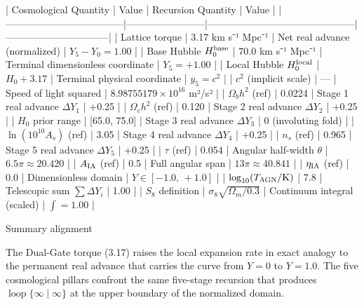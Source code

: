 | Cosmological Quantity              | Value                  | Recursion Quantity                          | Value                          |
|------------------------------------|------------------------|---------------------------------------------|--------------------------------|
| Lattice torque                     | 3.17 km s⁻¹ Mpc⁻¹     | Net real advance (normalized)               | \(Y_5 - Y_0 = 1.00\)          |
| Base Hubble \(H_0^{\rm base}\)     | 70.0 km s⁻¹ Mpc⁻¹     | Terminal dimensionless coordinate           | \(Y_5 = +1.00\)               |
| Local Hubble \(H_0^{\rm local}\)   | \(H_0 + 3.17\)        | Terminal physical coordinate                | \(y_5 = c^2\)                 |
| \(c^2\) (implicit scale)           | —                      | Speed of light squared                      | \(8.98755179 \times 10^{16}\) m²/s² |
| \(\Omega_b h^2\) (ref)             | 0.0224                 | Stage 1 real advance \(\Delta Y_1\)         | +0.25                          |
| \(\Omega_c h^2\) (ref)             | 0.120                  | Stage 2 real advance \(\Delta Y_2\)         | +0.25                          |
| \(H_0\) prior range                | [65.0, 75.0]           | Stage 3 real advance \(\Delta Y_3\)         | 0 (involuting fold)            |
| \(\ln(10^{10}A_s)\) (ref)          | 3.05                   | Stage 4 real advance \(\Delta Y_4\)         | +0.25                          |
| \(n_s\) (ref)                      | 0.965                  | Stage 5 real advance \(\Delta Y_5\)         | +0.25                          |
| \(\tau\) (ref)                     | 0.054                  | Angular half-width \(\theta\)               | \(6.5\pi \approx 20.420\)     |
| \(A_{\rm IA}\) (ref)               | 0.5                    | Full angular span                           | \(13\pi \approx 40.841\)      |
| \(\eta_{\rm IA}\) (ref)            | 0.0                    | Dimensionless domain                        | \(Y \in [-1.0,\,+1.0]\)       |
| \(\log_{10}(T_{\rm AGN}/{\rm K})\) | 7.8                    | Telescopic sum \(\sum\Delta Y_i\)           | 1.00                           |
| \(S_8\) definition                 | \(\sigma_8\sqrt{\Omega_m/0.3}\) | Continuum integral (scaled)            | \(\displaystyle\int = 1.00\)  |

Summary alignment

The Dual-Gate torque (3.17) raises the local expansion rate in exact analogy to the permanent real advance that carries the curve from \(Y=0\) to \(Y=1.0\).
The five cosmological pillars confront the same five-stage recursion that produces \(\operatorname{loop}\{\infty\mid\infty\}\) at the upper boundary of the normalized domain.
